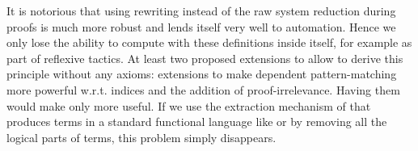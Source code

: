 It is notorious that using rewriting instead of the raw system reduction
during proofs is much more robust and lends itself very well to
automation. Hence we only lose the ability to compute with these
definitions inside \Coq itself, for example as part of reflexive
tactics. At least two proposed extensions to \Coq allow to derive this
principle without any axioms: extensions to make dependent
pattern-matching more powerful w.r.t. indices \cite{conf/types/BarrasCGHS08} and 
the addition of proof-irrelevance. Having them would make \Equations
only more useful.
If we use the extraction mechanism of \Coq %
that produces
terms in a standard functional language like \ML or \Haskell by removing
all the logical parts of terms, this problem simply disappears.


